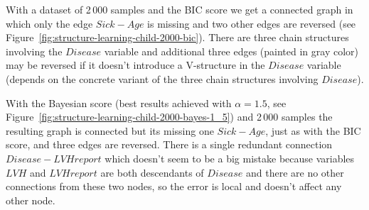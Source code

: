 \documentclass[english,cover]{fitthesis} %
\begin{document}
With a dataset of 2\,000 samples and the BIC score we get a connected graph in which only the edge $Sick - Age$ is missing and two other edges are reversed (see Figure~\ref{fig:structure-learning-child-2000-bic}). There are three chain structures involving the $Disease$ variable and additional three edges (painted in gray color) may be reversed if it doesn't introduce a V-structure in the $Disease$ variable (depends on the concrete variant of the three chain structures involving $Disease$).

With the Bayesian score (best results achieved with $\alpha=1.5$, see Figure~\ref{fig:structure-learning-child-2000-bayes-1_5}) and 2\,000 samples the resulting graph is connected but its missing one $Sick - Age$, just as with the BIC score, and three edges are reversed. There is a single redundant connection $Disease - LVHreport$ which doesn't seem to be a big mistake because variables $LVH$ and $LVHreport$ are both descendants of $Disease$ and there are no other connections from these two nodes, so the error is local and doesn't affect any other node.
\end{document}
